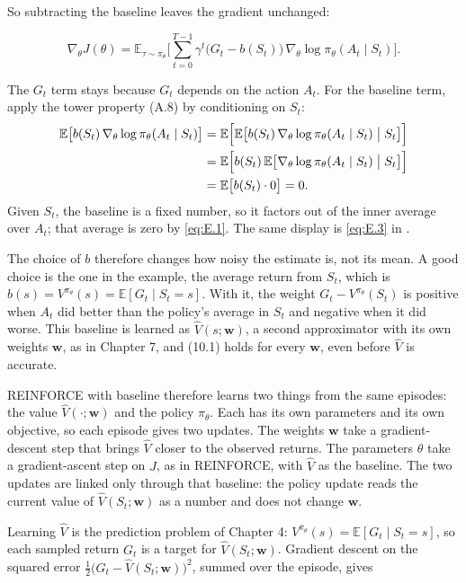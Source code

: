 So subtracting the baseline leaves the gradient unchanged:

\begin{equation}
\nabla_\theta J(\theta)
=
\mathbb{E}_{\tau\sim\pi_\theta}\Biggl[
\sum_{t=0}^{T-1}
\gamma^{t}\bigl(G_t-b(S_t)\bigr)\,\nabla_\theta\log\pi_\theta(A_t\mid S_t)
\Biggr].
\tag{10.1}
\end{equation}

The $G_t$ term stays because $G_t$ depends on the action $A_t$. For the baseline term, apply the tower property (A.8) by conditioning on $S_t$: \[
\begin{aligned}
\mathbb{E}\bigl[b(S_t)\,\nabla_\theta\log\pi_\theta(A_t\mid S_t)\bigr]
&=
\mathbb{E}\Bigl[\mathbb{E}\bigl[b(S_t)\,\nabla_\theta\log\pi_\theta(A_t\mid S_t)\bigm|S_t\bigr]\Bigr]
\\
&=
\mathbb{E}\Bigl[b(S_t)\,\mathbb{E}\bigl[\nabla_\theta\log\pi_\theta(A_t\mid S_t)\bigm|S_t\bigr]\Bigr]
\\
&=
\mathbb{E}\bigl[b(S_t)\cdot 0\bigr]
=
0.
\end{aligned}
\] Given $S_t$, the baseline is a fixed number, so it factors out of the inner average over $A_t$; that average is zero by \eqref{eq:E.1}. The same display is \eqref{eq:E.3} in .

The choice of $b$ therefore changes how noisy the estimate is, not its mean. A good choice is the one in the example, the average return from $S_t$, which is $b(s)=V^{\pi_\theta}(s)=\mathbb{E}[G_t\mid S_t=s]$. With it, the weight $G_t-V^{\pi_\theta}(S_t)$ is positive when $A_t$ did better than the policy's average in $S_t$ and negative when it did worse. This baseline is learned as $\hat{V}(s;\mathbf{w})$, a second approximator with its own weights $\mathbf{w}$, as in Chapter 7, and (10.1) holds for every $\mathbf{w}$, even before $\hat{V}$ is accurate.

REINFORCE with baseline therefore learns two things from the same episodes: the value $\hat{V}(\cdot;\mathbf{w})$ and the policy $\pi_\theta$. Each has its own parameters and its own objective, so each episode gives two updates. The weights $\mathbf{w}$ take a gradient-descent step that brings $\hat{V}$ closer to the observed returns. The parameters $\theta$ take a gradient-ascent step on $J$, as in REINFORCE, with $\hat{V}$ as the baseline. The two updates are linked only through that baseline: the policy update reads the current value of $\hat{V}(S_t;\mathbf{w})$ as a number and does not change $\mathbf{w}$.

Learning $\hat{V}$ is the prediction problem of Chapter 4: $V^{\pi_\theta}(s)=\mathbb{E}[G_t\mid S_t=s]$, so each sampled return $G_t$ is a target for $\hat{V}(S_t;\mathbf{w})$. Gradient descent on the squared error $\tfrac12\bigl(G_t-\hat{V}(S_t;\mathbf{w})\bigr)^2$, summed over the episode, gives

